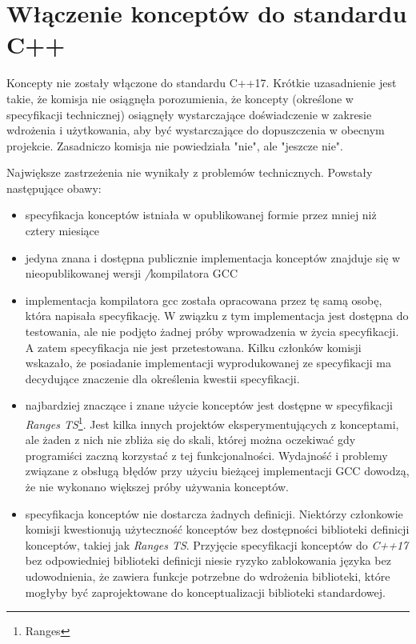 \documentclass[11pt, a4paper]{article}
\begin{document}
\lstset{language=C++}

\section{Włączenie konceptów do standardu C++}

Koncepty nie zostały włączone do standardu C++17. Krótkie uzasadnienie jest takie, że komisja nie osiągnęła porozumienia, że koncepty (określone w specyfikacji technicznej) osiągnęły wystarczające doświadczenie w zakresie wdrożenia i użytkowania, aby być wystarczające do dopuszczenia w obecnym projekcie. Zasadniczo komisja nie powiedziała "nie", ale "jeszcze nie".

Największe zastrzeżenia nie wynikały z problemów technicznych. Powstały następujące obawy:

\begin{itemize}

\item specyfikacja konceptów istniała w opublikowanej formie przez mniej niż cztery miesiące
\item jedyna znana i dostępna publicznie implementacja konceptów znajduje się w nieopublikowanej wersji \emph/{kompilatora GCC}
\item implementacja kompilatora gcc została opracowana przez tę samą osobę, która napisała specyfikację. W związku z tym implementacja jest dostępna do testowania, ale nie podjęto żadnej próby wprowadzenia w życia specyfikacji. A zatem specyfikacja nie jest przetestowana. Kilku członków komisji wskazało, że posiadanie implementacji wyprodukowanej ze specyfikacji ma decydujące znaczenie dla określenia kwestii specyfikacji.
\item najbardziej znaczące i znane użycie konceptów jest dostępne w specyfikacji \emph{Ranges TS}\footnote{Ranges}. Jest kilka innych projektów eksperymentujących z konceptami, ale żaden z nich nie zbliża się do skali, której można oczekiwać gdy programiści zaczną korzystać z tej funkcjonalności. Wydajność i problemy związane z obsługą błędów przy użyciu bieżącej implementacji GCC dowodzą, że nie wykonano większej próby używania konceptów.
\item specyfikacja konceptów nie dostarcza żadnych definicji. Niektórzy członkowie komisji kwestionują użyteczność konceptów bez dostępności biblioteki definicji konceptów, takiej jak \emph{Ranges TS}. Przyjęcie specyfikacji konceptów do \emph{C++17} bez odpowiedniej biblioteki definicji niesie ryzyko zablokowania języka bez udowodnienia, że zawiera funkcje potrzebne do wdrożenia biblioteki, które mogłyby być zaprojektowane do konceptualizacji biblioteki standardowej.

\end{itemize}
\end{document}
